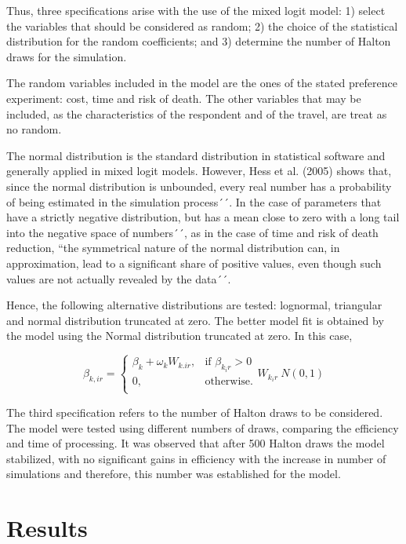 \documentclass[]{elsarticle} %
\begin{document}
Thus, three specifications arise with the use of the mixed logit model:
1) select the variables that should be considered as random; 2) the
choice of the statistical distribution for the random coefficients; and
3) determine the number of Halton draws for the simulation.

The random variables included in the model are the ones of the stated
preference experiment: cost, time and risk of death. The other variables
that may be included, as the characteristics of the respondent and of
the travel, are treat as no random.

The normal distribution is the standard distribution in statistical
software and generally applied in mixed logit models. However, Hess et
al. (2005) shows that, since the normal distribution is unbounded, every
real number has a probability of being estimated in the simulation
process´´. In the case of parameters that have a strictly negative
distribution, but has a mean close to zero with a long tail into the
negative space of numbers´´, as in the case of time and risk of death
reduction, ``the symmetrical nature of the normal distribution can, in
approximation, lead to a significant share of positive values, even
though such values are not actually revealed by the data´´.

Hence, the following alternative distributions are tested: lognormal,
triangular and normal distribution truncated at zero. The better model
fit is obtained by the model using the Normal distribution truncated at
zero. In this case,

\begin{equation}
    \beta_{k,ir} = 
       \begin{cases}
            \beta_k + \omega_kW_{k.ir}, & \mbox{if } \beta_{k_ir} > 0 \\

             0, & \mbox{otherwise.} \\
       \end{cases} 
       W_{k_ir} ~ N(0,1)
\end{equation}

The third specification refers to the number of Halton draws to be
considered. The model were tested using different numbers of draws,
comparing the efficiency and time of processing. It was observed that
after 500 Halton draws the model stabilized, with no significant gains
in efficiency with the increase in number of simulations and therefore,
this number was established for the model.

\hypertarget{results}{%
\section{Results}\label{results}}
\end{document}
